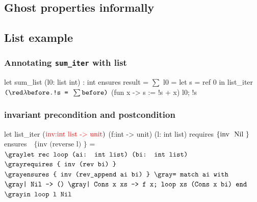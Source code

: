 \subsection*{Ghost properties informally}
\begin{frame}
	

\end{frame}

\subsection*{List example} 
\begin{frame}[fragile]
\frametitle{Annotating \texttt{sum\_iter} with list}
\begin{footnotesize}
\begin{whycode}
  let sum_list (l0: list int) : int
    ensures { result = $\sum$ l0 }
  = let s = ref 0 in
    list_iter $\texttt{(}{\red \lambda \texttt{before.!s = } \sum \texttt{before)}}$ (fun x -> s := !s + x) l0; 
    !s     
\end{whycode}
\end{footnotesize}
\end{frame}


\begin{frame}[fragile]
\frametitle{invariant precondition and postcondition}
\begin{footnotesize}
\begin{whycode}
let list_iter ($\textcolor{red}{\text{inv:int list -> unit}})$ 
    (f:int -> unit) (l: int list)
     requires  $\text{\{\text{inv } Nil \}}$
     ensures $\text{~~}\{ \text{inv (reverse l)
     	 }\}$    
 = ${\gray\texttt{let rec loop (ai: int list) (bi: int list)}}$
      ${\gray\texttt{requires \{ inv (rev bi) \} }}$
      ${\gray\texttt{ensures  \{ inv (rev\_append ai bi) \}}}$  
    ${\gray\texttt{= match ai with}}$
       ${\gray\texttt{| Nil       -> ()}}$
       ${\gray\texttt{| Cons x xs -> f x; loop xs (Cons x bi) end}}$
   ${\gray\texttt{in loop l Nil}}$
\end{whycode}
\end{footnotesize}
\end{frame}
\addtocounter{framenumber}{-1}


